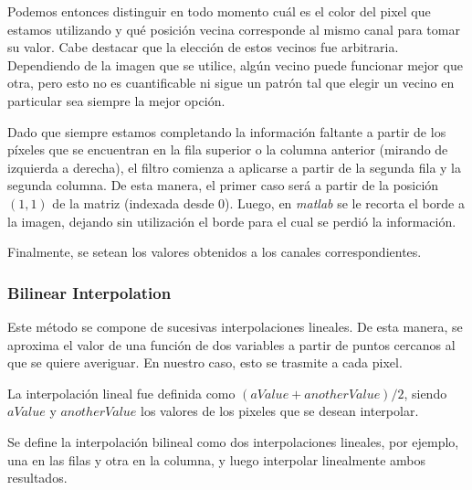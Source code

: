 \par 
Podemos entonces distinguir en todo momento cuál es el color del pixel que estamos utilizando y qué posición vecina corresponde al mismo canal para tomar su valor. Cabe destacar que la elección de estos vecinos fue arbitraria. Dependiendo de la imagen que se utilice, algún vecino puede funcionar mejor que otra, pero esto no es cuantificable ni sigue un patrón tal que elegir un vecino en particular sea siempre la mejor opción.
\par 
Dado que siempre estamos completando la información faltante a partir de los píxeles que se encuentran en la fila superior o la columna anterior (mirando de izquierda a derecha), el filtro comienza a aplicarse a partir de la segunda fila y la segunda columna. De esta manera, el primer caso será a partir de la posición $(1,1)$ de la matriz (indexada desde 0). Luego, en \textit{matlab} se le recorta el borde a la imagen, dejando sin utilización el borde para el cual se perdió la información.
\par 
Finalmente, se setean los valores obtenidos a los canales correspondientes.



\subsubsection{Bilinear Interpolation}
Este método se compone de sucesivas interpolaciones lineales. De esta manera, se aproxima el valor de una función de dos variables a partir de puntos cercanos al que se quiere averiguar. En nuestro caso, esto se trasmite a cada pixel.  
\par 
La interpolación lineal fue definida como \textit{$(aValue + anotherValue)/2$}, siendo $aValue$ y $anotherValue$ los valores de los pixeles que se desean interpolar. 
\par 
Se define la interpolación bilineal como dos interpolaciones lineales, por ejemplo, una en las filas y otra en la columna, y luego interpolar linealmente ambos resultados. 

